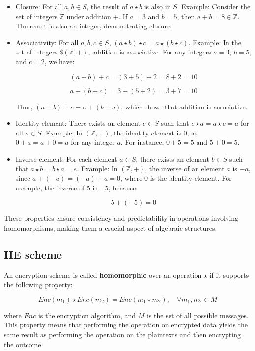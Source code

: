 \documentclass[
  letterpaper,
  DIV=11,
  numbers=noendperiod,
  oneside]{scrartcl}
\begin{document}
\begin{itemize}
\item
  Closure: For all \(a, b \in S\), the result of \(a \star b\) is also
  in \(S\). Example: Consider the set of integers \(\mathbb{Z}\) under
  addition \(+\). If \(a = 3\) and \(b = 5\), then
  \(a + b = 8 \in \mathbb{Z}\). The result is also an integer,
  demonstrating closure.
\item
  Associativity: For all \(a, b, c \in S\),
  \((a \star b) \star c = a \star (b \star c)\). Example: In the set of
  integers \$\((\mathbb{Z}, +)\), addition is associative. For any
  integers \(a = 3\), \(b = 5\), and \(c = 2\), we have:

  \[
  (a + b) + c = (3 + 5) + 2 = 8 + 2 = 10
  \]

  \[
  a + (b + c) = 3 + (5 + 2) = 3 + 7 = 10
  \]

  Thus, \((a + b) + c = a + (b + c)\), which shows that addition is
  associative.
\item
  Identity element: There exists an element \(e \in S\) such that
  \(e \star a = a \star e = a\) for all \(a \in S\). Example: In
  \((\mathbb{Z}, +)\), the identity element is \(0\), as
  \(0 + a = a + 0 = a\) for any integer \(a\). For instance,
  \(0 + 5 = 5\) and \(5 + 0 = 5\).
\item
  Inverse element: For each element \(a \in S\), there exists an element
  \(b \in S\) such that \(a \star b = b \star a = e\). Example: In
  \((\mathbb{Z}, +)\), the inverse of an element \(a\) is \(-a\), since
  \(a + (-a) = (-a) + a = 0\), where \(0\) is the identity element. For
  example, the inverse of \(5\) is \(-5\), because:

  \[
  5 + (-5) = 0
  \]
\end{itemize}

These properties ensure consistency and predictability in operations
involving homomorphisms, making them a crucial aspect of algebraic
structures.

\subsection{HE scheme}\label{he-scheme}

An encryption scheme is called \textbf{homomorphic} over an operation
\(\star\) if it supports the following property:

\[
Enc(m_1) \star Enc(m_2) = Enc(m_1 \star m_2), \quad \forall m_1, m_2 \in M
\]

where \(Enc\) is the encryption algorithm, and \(M\) is the set of all
possible messages. This property means that performing the operation on
encrypted data yields the same result as performing the operation on the
plaintexts and then encrypting the outcome.
\end{document}

